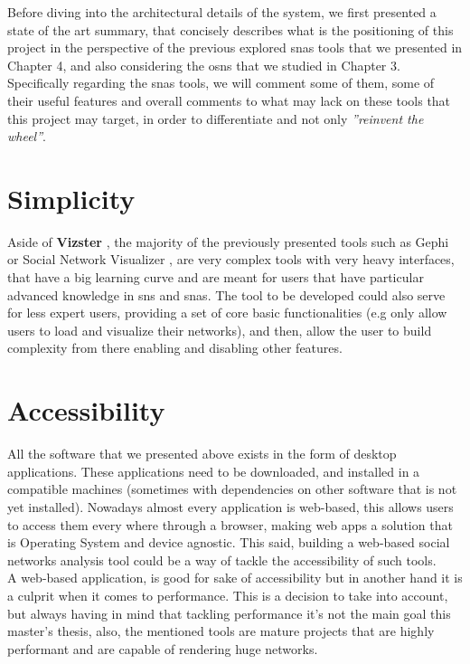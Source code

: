 Before diving into the architectural details of the system, we first presented a state of the art summary, that concisely describes what is the positioning of this project in the perspective of the previous explored \glspl{sna} tools that we presented in Chapter 4, and also considering the \glspl{osn} that we studied in Chapter 3.\\
\indent Specifically regarding the \glspl{sna} tools, we will comment some of them, some of their useful features and overall comments to what may lack on these tools that this project may target, in order to differentiate and not only \textit{''reinvent the wheel''}.

\section{Simplicity}
Aside of \textbf{Vizster} \citep{heer2005vizster}, the majority of the previously presented tools such as Gephi \citep{bastian2009gephi} or Social Network Visualizer \citep{socnetv}, are very complex tools with very heavy interfaces, that have a big learning curve and are meant for users that have particular advanced knowledge in \glspl{sn} and \glspl{sna}. The tool to be developed could also serve for less expert users, providing a set of core basic functionalities (e.g only allow users to load and visualize their networks), and then, allow the user to build complexity from there enabling and disabling other features.

\section{Accessibility}
All the software that we presented above exists in the form of desktop applications. These applications need to be downloaded, and installed in a compatible machines (sometimes with dependencies on other software that is not yet installed). Nowadays almost every application is web-based, this allows users to access them every where through a browser, making web apps a solution that is Operating System and device agnostic. This said, building a web-based social networks analysis tool could be a way of tackle the accessibility of such tools.\\
\indent A web-based application, is good for sake of accessibility but in another hand it is a culprit when it comes to performance. This is a decision to take into account, but always having in mind that tackling performance it's not the main goal this master's thesis, also, the mentioned tools are mature projects that are highly performant and are capable of rendering huge networks.

